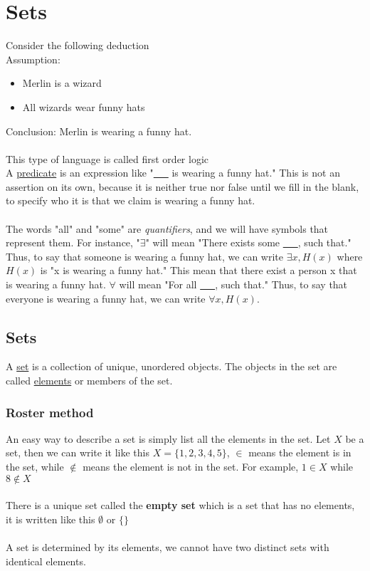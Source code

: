 \documentclass[../MATH-2000-Notes.tex]{subfiles}
\begin{document}
\chapter{Sets}
Consider the following deduction\\
Assumption:
\begin{itemize}
    \item Merlin is a wizard
    \item All wizards wear funny hats
\end{itemize}
Conclusion: Merlin is wearing a funny hat.
\\~\\
This type of language is called first order logic\\
A \underline{predicate} is an expression like "\underline{\ \ \ } is wearing a funny hat." This is not an assertion on its own, because it is neither true nor false until we fill in the blank, to specify who it is that we claim is wearing a funny hat.
\\~\\
The words "all" and "some" are \textit{quantifiers}, and we will have symbols that represent them. For instance, "\(\exists\)" will mean "There exists some \underline{\ \ \ }, such that." Thus, to say that someone is wearing a funny hat, we can write \(\exists x, H(x)\) where \(H(x)\) is "x is wearing a funny hat." This mean that there exist a person x that is wearing a funny hat. \(\forall\) will mean "For all \underline{\ \ \ }, such that." Thus, to say that everyone is wearing a funny hat, we can write \(\forall x, H(x)\).
\section{Sets}
A \underline{set} is a collection of unique, unordered objects. The objects in the set are called \underline{elements} or members of the set. 
\subsection{Roster method}
An easy way to describe a set is simply list all the elements in the set. Let \(X\) be a set, then we can write it like this \(X = \{1,2,3,4,5\}\), \(\in\) means the element is in the set, while \(\notin\) means the element is not in the set. For example, \(1 \in X\) while \(8\notin X\)
\\~\\
There is a unique set called the \textbf{empty set} which is a set that has no elements, it is written like this \(\emptyset\) or \( \{\}\)
\\~\\
A set is determined by its elements, we cannot have two distinct sets with identical elements.
\end{document}

